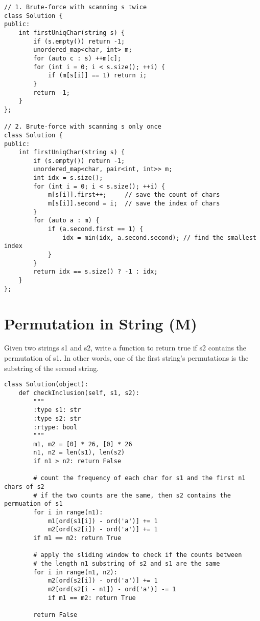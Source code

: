 \begin{lstlisting}
// 1. Brute-force with scanning s twice
class Solution {
public:
    int firstUniqChar(string s) {
        if (s.empty()) return -1;
        unordered_map<char, int> m;
        for (auto c : s) ++m[c];
        for (int i = 0; i < s.size(); ++i) {
            if (m[s[i]] == 1) return i;
        }
        return -1;
    }
};

// 2. Brute-force with scanning s only once
class Solution {
public:
    int firstUniqChar(string s) {
        if (s.empty()) return -1;
        unordered_map<char, pair<int, int>> m;
        int idx = s.size();
        for (int i = 0; i < s.size(); ++i) {
            m[s[i]].first++;     // save the count of chars
            m[s[i]].second = i;  // save the index of chars
        }
        for (auto a : m) {
            if (a.second.first == 1) {
                idx = min(idx, a.second.second); // find the smallest index
            }
        }
        return idx == s.size() ? -1 : idx;
    }
};
\end{lstlisting}

\section{Permutation in String (M)}
Given two strings s1 and s2, write a function to return true if s2 contains the permutation of s1. In other words, one of the first string's permutations is the substring of the second string.

\begin{lstlisting}
class Solution(object):
    def checkInclusion(self, s1, s2):
        """
        :type s1: str
        :type s2: str
        :rtype: bool
        """
        m1, m2 = [0] * 26, [0] * 26
        n1, n2 = len(s1), len(s2)
        if n1 > n2: return False
        
        # count the frequency of each char for s1 and the first n1 chars of s2 
        # if the two counts are the same, then s2 contains the permuation of s1
        for i in range(n1):
            m1[ord(s1[i]) - ord('a')] += 1
            m2[ord(s2[i]) - ord('a')] += 1
        if m1 == m2: return True
        
        # apply the sliding window to check if the counts between
        # the length n1 substring of s2 and s1 are the same
        for i in range(n1, n2):
            m2[ord(s2[i]) - ord('a')] += 1
            m2[ord(s2[i - n1]) - ord('a')] -= 1
            if m1 == m2: return True
            
        return False
\end{lstlisting}

